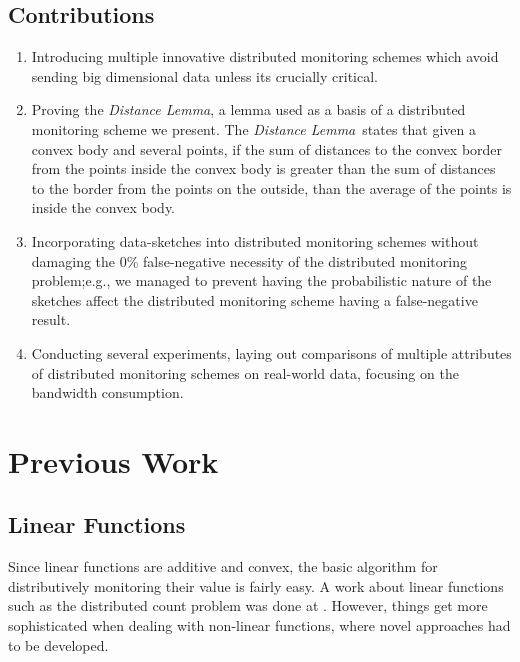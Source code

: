 \documentclass[10pt, conference]{IEEEtran}
\newcommand{\distanceLemma}{\textit{Distance Lemma}}
\begin{document}
\subsection{Contributions}
\begin{enumerate}
\item Introducing multiple innovative distributed monitoring schemes which avoid sending big dimensional data unless its crucially critical.
\item Proving the \distanceLemma , a lemma used as a basis of a distributed monitoring scheme we present. The \distanceLemma \ states that given a convex body and several points, if the sum of distances to the convex border from the points inside the convex body is greater than the sum of distances to the border from the points on the outside, than the average of the points is inside the convex body.
\item Incorporating data-sketches into distributed monitoring schemes without damaging the 0\% false-negative necessity of the distributed monitoring problem;e.g., we managed to prevent having the probabilistic nature of the sketches affect the distributed monitoring scheme having a false-negative result.
\item Conducting several experiments, laying out comparisons of multiple attributes of distributed monitoring schemes on real-world data, focusing on the bandwidth consumption.
\end{enumerate}

\section{Previous Work}
\subsection{Linear Functions}
Since linear functions are additive and convex, the basic algorithm for distributively monitoring their value is fairly easy. A work about linear functions such as the distributed count problem was done at \cite{keralapura2006communication}. However, things get more sophisticated when dealing with non-linear functions, where novel approaches had to be developed.
\end{document}
